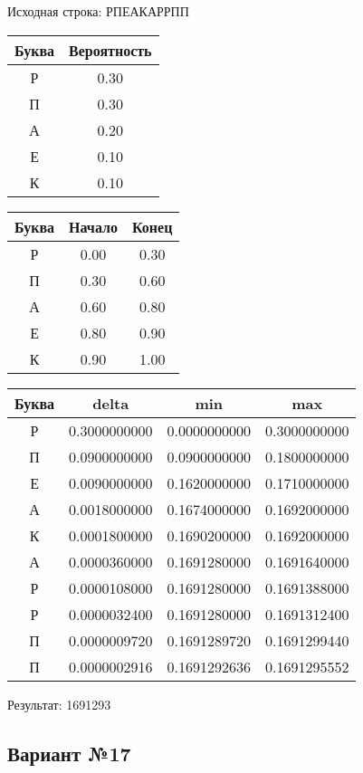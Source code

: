\documentclass[a4paper, 12pt]{article}
\begin{document}
Исходная строка: РПЕАКАРРПП\
\begin{center}
 \begin{tabular}{ |c|c| } 
  \hline
     Буква & Вероятность \\ \hline
Р & 0.30\\\hline
П & 0.30\\\hline
А & 0.20\\\hline
Е & 0.10\\\hline
К & 0.10
\\ \hline \end{tabular}
\end{center}
\begin{center}
 \begin{tabular}{ |c|c|c| } 
  \hline
     Буква & Начало & Конец \\ \hline
Р & 0.00 & 0.30\\\hline
П & 0.30 & 0.60\\\hline
А & 0.60 & 0.80\\\hline
Е & 0.80 & 0.90\\\hline
К & 0.90 & 1.00
\\ \hline \end{tabular}
\end{center}
\begin{center}
 \begin{tabular}{ |c|c|c|c| } 
  \hline
     Буква & delta & min & max \\ \hline
Р & 0.3000000000 & 0.0000000000 & 0.3000000000\\\hline
П & 0.0900000000 & 0.0900000000 & 0.1800000000\\\hline
Е & 0.0090000000 & 0.1620000000 & 0.1710000000\\\hline
А & 0.0018000000 & 0.1674000000 & 0.1692000000\\\hline
К & 0.0001800000 & 0.1690200000 & 0.1692000000\\\hline
А & 0.0000360000 & 0.1691280000 & 0.1691640000\\\hline
Р & 0.0000108000 & 0.1691280000 & 0.1691388000\\\hline
Р & 0.0000032400 & 0.1691280000 & 0.1691312400\\\hline
П & 0.0000009720 & 0.1691289720 & 0.1691299440\\\hline
П & 0.0000002916 & 0.1691292636 & 0.1691295552
\\ \hline \end{tabular}
\end{center}
Результат: 1691293
\pagebreak
\subsection{Вариант №17}
\end{document}
